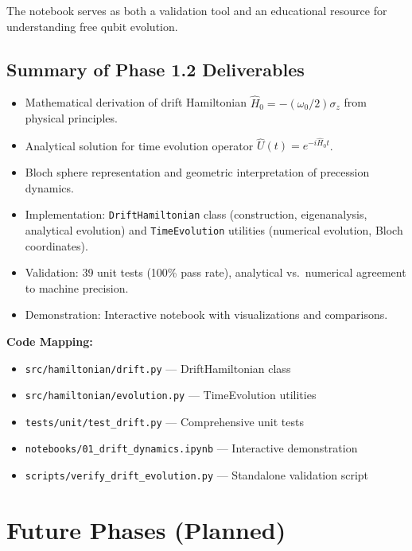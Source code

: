 \documentclass[11pt,a4paper]{article}
\theoremstyle{definition}
\theoremstyle{remark}
\begin{document}
The notebook serves as both a validation tool and an educational resource for understanding free qubit evolution.

\subsection{Summary of Phase 1.2 Deliverables}

\begin{itemize}
    \item Mathematical derivation of drift Hamiltonian $\hat{H}_0 = -(\omega_0/2) \sigma_z$ from physical principles.
    \item Analytical solution for time evolution operator $\hat{U}(t) = e^{-i\hat{H}_0 t}$.
    \item Bloch sphere representation and geometric interpretation of precession dynamics.
    \item Implementation: \texttt{DriftHamiltonian} class (construction, eigenanalysis, analytical evolution) and \texttt{TimeEvolution} utilities (numerical evolution, Bloch coordinates).
    \item Validation: 39 unit tests (100\% pass rate), analytical vs.\ numerical agreement to machine precision.
    \item Demonstration: Interactive notebook with visualizations and comparisons.
\end{itemize}

\textbf{Code Mapping:}
\begin{itemize}
    \item \texttt{src/hamiltonian/drift.py} — DriftHamiltonian class
    \item \texttt{src/hamiltonian/evolution.py} — TimeEvolution utilities
    \item \texttt{tests/unit/test\_drift.py} — Comprehensive unit tests
    \item \texttt{notebooks/01\_drift\_dynamics.ipynb} — Interactive demonstration
    \item \texttt{scripts/verify\_drift\_evolution.py} — Standalone validation script
\end{itemize}

\section{Future Phases (Planned)}
\end{document}

